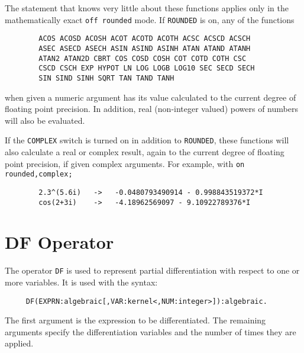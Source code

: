 The statement that {\REDUCE} knows very little about these functions
applies only in the mathematically exact {\tt off rounded} mode.  If
{\tt ROUNDED}  is on, any of the functions
\begin{verbatim}
        ACOS ACOSD ACOSH ACOT ACOTD ACOTH ACSC ACSCD ACSCH
        ASEC ASECD ASECH ASIN ASIND ASINH ATAN ATAND ATANH
        ATAN2 ATAN2D CBRT COS COSD COSH COT COTD COTH CSC
        CSCD CSCH EXP HYPOT LN LOG LOGB LOG10 SEC SECD SECH
        SIN SIND SINH SQRT TAN TAND TANH

\end{verbatim}
    
    
   
   
    
    
    
    
    
  
when given a numeric argument has its value calculated to the current
degree of floating point precision.  In addition, real (non-integer
valued) powers of numbers will also be evaluated.

If the {\tt COMPLEX} switch is turned on in addition to {\tt ROUNDED},
these functions will also calculate a real or complex result, again to
the current degree of floating point precision,
if given complex arguments.  For example, with {\tt on rounded,complex;}
\begin{verbatim}
        2.3^(5.6i)   ->   -0.0480793490914 - 0.998843519372*I
        cos(2+3i)    ->   -4.18962569097 - 9.10922789376*I
\end{verbatim}

\section{DF Operator}
The operator {\tt DF}  is used to represent partial
differentiation  with respect
to one or more variables. It is used with the syntax:
\begin{verbatim}
     DF(EXPRN:algebraic[,VAR:kernel<,NUM:integer>]):algebraic.
\end{verbatim}
The first argument is the expression to be differentiated. The remaining
arguments specify the differentiation variables and the number of times
they are applied.

